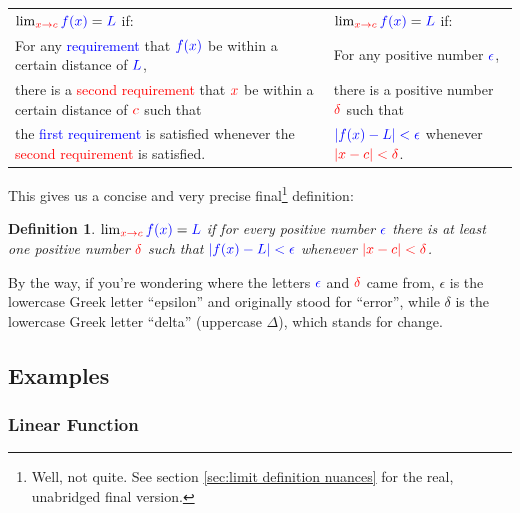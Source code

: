 \documentclass{myarticle}
\newcommand{\hor}[1]{\textcolor{red}{#1}} %
\newcommand{\ver}[1]{\textcolor{blue}{#1}}
\theoremstyle{nospace}
\newtheorem*{oldattempt}{Definition}
\newenvironment{attempt}{\begin{mdframed}\begin{oldattempt}}{\end{oldattempt}\end{mdframed}}
\newtheorem{old series theorem}{Theorem}
\newenvironment{series theorem}{\begin{mdframed}\begin{old series theorem}}{\end{old series theorem}\end{mdframed}}
\begin{document}
\begin{mdframed}
\setlength{\LTpre}{0pt}
\setlength{\LTpost}{0pt}
\begin{longtable}{P{0.47\textwidth}|P{0.47\textwidth}}

$\lim_{\hor{x \to c}} \ver{f(x)} = \ver{L}$ if: &
$\lim_{\hor{x \to c}} \ver{f(x)} = \ver{L}$ if: \\

For any \ver{requirement} that $\ver{f(x)}$ be within a certain distance of $\ver{L}$, &
For any positive number $\ver{\epsilon}$, \\

there is a \hor{second requirement} that $\hor{x}$ be within a certain distance of $\hor{c}$ such that &
there is a positive number $\hor{\delta}$ such that \\

the \ver{first requirement} is satisfied whenever the \hor{second requirement} is satisfied. &
$\ver{|f(x) - L| < \epsilon}$ whenever $\hor{|x - c| < \delta}$. \\

\end{longtable} \end{mdframed}

This gives us a concise and very precise final\footnote{Well, not quite. See section \ref{sec:limit definition nuances} for the real, unabridged final version.} definition:

\begin{attempt} $\lim_{\hor{x \to c}} \ver{f(x)} = \ver{L}$ if for every positive number $\ver{\epsilon}$ there is at least one positive number $\hor{\delta}$ such that $\ver{|f(x) - L| < \epsilon}$ whenever $\hor{|x - c| < \delta}$. \end{attempt}

By the way, if you're wondering where the letters $\ver{\epsilon}$ and $\hor{\delta}$ came from, $\epsilon$ is the lowercase Greek letter ``epsilon'' and originally stood for ``error'', while $\delta$ is the lowercase Greek letter ``delta'' (uppercase $\Delta$), which stands for change.

\subsection{Examples} \label{sec:limit definition examples}

\subsubsection{Linear Function} \label{sec:linear function}
\end{document}

